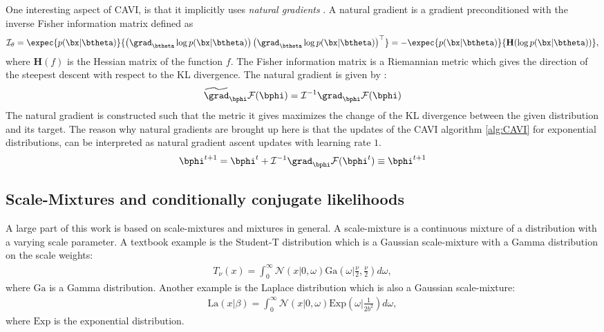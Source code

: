 One interesting aspect of \ac{CAVI}, is that it implicitly uses \textit{natural gradients} \cite{amariNaturalGradientWorks1998}.
A natural gradient is a gradient preconditioned with the inverse Fisher information matrix defined as
\begin{align}
    \mathcal{I}_\theta = \expec{p(\bx|\btheta)}{\left(\grad_{\btheta}\log p(\bx|\btheta)\right)\left(\grad_{\btheta} \log p(\bx|\btheta)\right)^\top} = -\expec{p(\bx|\btheta)}{\mathbf{H}(\log p(\bx|\btheta))},
    \label{eq:fisherinfomatrix}
\end{align}
where $\mathbf{H}(f)$ is the Hessian matrix of the function $f$.
The Fisher information matrix is a Riemannian metric which gives the direction of the steepest descent with respect to the KL divergence.
The natural gradient is given by :
\begin{align*}
    \widetilde{\grad}_{\bphi}\mathcal{F}(\bphi) = \mathcal{I}^{-1} \grad_{\bphi}\mathcal{F}(\bphi)
\end{align*}
The natural gradient is constructed such that the metric it gives maximizes the change of the \ac{KL} divergence between the given distribution and its target.
The reason why natural gradients are brought up here is that the updates of the \ac{CAVI} algorithm \ref{alg:CAVI} for exponential distributions, can be interpreted as natural gradient ascent updates with learning rate $1$.
\begin{align*}
    \bphi^{t+1} = \bphi^t + \mathcal{I}^{-1}\grad_{\bphi}\mathcal{F}(\bphi^t) \equiv \bphi^{t+1}
\end{align*}


\subsection{Scale-Mixtures and conditionally conjugate likelihoods}
\label{sec:scale-mixtures}
A large part of this work is based on scale-mixtures and mixtures in general.
A scale-mixture is a continuous mixture of a distribution with a varying scale parameter.
A textbook example is the Student-T distribution which is a Gaussian scale-mixture with a Gamma distribution on the scale weights:
\begin{align*}
    T_\nu(x) = \int_{0}^\infty \mathcal{N}\left(x|0,\omega\right)\mathrm{Ga}\left(\omega|\frac{\nu}{2}, \frac{\nu}{2}\right)d\omega,
\end{align*}
where $\mathrm{Ga}$ is a Gamma distribution.
Another example is the Laplace distribution which is also a Gaussian scale-mixture:
\begin{align*}
    \mathrm{La}(x|\beta) = \int_0^{\infty} \mathcal{N}(x|0,\omega)\mathrm{Exp}\left(\omega|\frac{1}{2b^2}\right)d\omega,
\end{align*}
where $\mathrm{Exp}$ is the exponential distribution.

